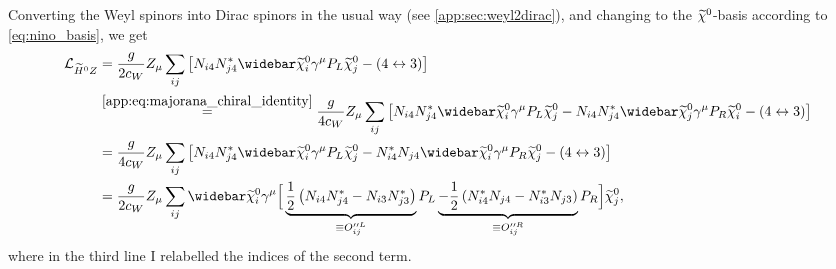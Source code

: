 \documentclass[english, notitlepage]{article}
\begin{document}
            Converting the Weyl spinors into Dirac spinors in the usual way (see \cref{app:sec:weyl2dirac}), and changing to the \(\widetilde{\chi}^0_{}\)-basis according to \cref{eq:nino_basis}, we get
            \begin{align}
                \nonumber
                \L_{\wtilde{H}^0Z} & = \frac{g}{2c_W} Z_\mu \sum_{ij} \bclosed{N_{i4}N_{j4}^* \barnino[i]\gamma^\mu P_L \nino[j] - (4 \leftrightarrow 3)}                                                                                                                                                                      \\
                \nonumber
                                   & \stackrel{\mathrm{\cref{app:eq:majorana_chiral_identity}}}{=} \frac{g}{4c_W} Z_\mu \sum_{ij} \bclosed{N_{i4}N_{j4}^* \barnino[i]\gamma^\mu P_L \nino[j] - N_{i4}N_{j4}^* \barnino[j]\gamma^\mu P_R \nino[i] - (4 \leftrightarrow 3)}                                                                                                                  \\
                \nonumber
                                   & = \frac{g}{4c_W} Z_\mu \sum_{ij} \bclosed{N_{i4}N_{j4}^* \barnino[i]\gamma^\mu P_L \nino[j] - N_{i4}^*N_{j4} \barnino[i]\gamma^\mu P_R \nino[j] - (4 \leftrightarrow 3)}                                                                                                                  \\
                                   & = \frac{g}{2c_W} Z_\mu \sum_{ij} \barnino[i] \gamma^\mu \Big[ \underbrace{\frac{1}{2}\pclosed{N_{i4}N_{j4}^* - N_{i3}N_{j3}^*}}_{\equiv O^{\prime\prime L}_{ij}}P_L \underbrace{-\frac{1}{2}\pclosed{N_{i4}^*N_{j4} - N_{i3}^*N_{j3}}}_{\equiv O^{\prime\prime R}_{ij}}P_R \Big] \nino[j],
            \end{align}
            where in the third line I relabelled the indices of the second term.

\end{document}
